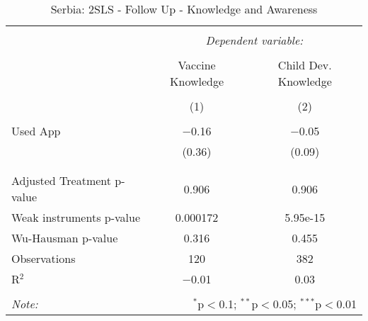 
\begin{table}[!htbp] \centering 
  \caption{Serbia: 2SLS - Follow Up - Knowledge and Awareness} 
  \label{tbl:Serbia: 2SLS - Follow Up - Knowledge and Awareness} 
\begin{tabular}{@{\extracolsep{5pt}}lcc} 
\\[-1.8ex]\hline 
\hline \\[-1.8ex] 
 & \multicolumn{2}{c}{\textit{Dependent variable:}} \\ 
\cline{2-3} 
\\[-1.8ex] & Vaccine Knowledge & Child Dev. Knowledge \\ 
\\[-1.8ex] & (1) & (2)\\ 
\hline \\[-1.8ex] 
 Used App & $-$0.16 & $-$0.05 \\ 
  & (0.36) & (0.09) \\ 
  & & \\ 
\hline \\[-1.8ex] 
Adjusted Treatment p-value & 0.906 & 0.906 \\ 
Weak instruments p-value & 0.000172 & 5.95e-15 \\ 
Wu-Hausman p-value & 0.316 & 0.455 \\ 
Observations & 120 & 382 \\ 
R$^{2}$ & $-$0.01 & 0.03 \\ 
\hline 
\hline \\[-1.8ex] 
\textit{Note:}  & \multicolumn{2}{r}{$^{*}$p$<$0.1; $^{**}$p$<$0.05; $^{***}$p$<$0.01} \\ 
\end{tabular} 
\end{table} 

